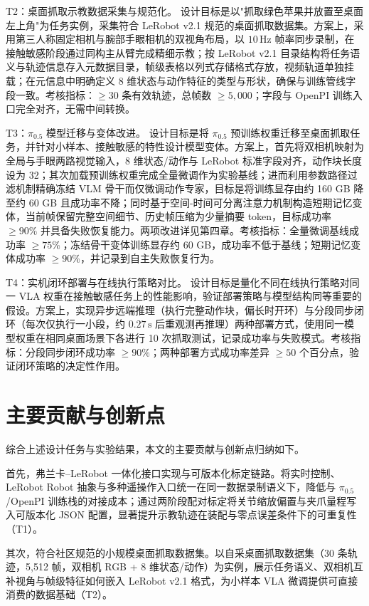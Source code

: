 T2：桌面抓取示教数据采集与规范化。
设计目标是以"抓取绿色苹果并放置至桌面左上角"为任务实例，采集符合 LeRobot v2.1 规范的桌面抓取数据集。方案上，采用第三人称固定相机与腕部手眼相机的双视角布局，以 $10\,\mathrm{Hz}$ 帧率同步录制，在接触敏感阶段通过同构主从臂完成精细示教；按 LeRobot v2.1 目录结构将任务语义与轨迹信息存入元数据目录，帧级表格以列式存储格式存放，视频轨道单独挂载；在元信息中明确定义 8 维状态与动作特征的类型与形状，确保与训练管线字段一致。考核指标：$\geqslant 30$ 条有效轨迹，总帧数 $\geqslant 5,000$；字段与 OpenPI 训练入口完全对齐，无需中间转换。

T3：$\pi_{0.5}$ 模型迁移与变体改进。
设计目标是将 $\pi_{0.5}$ 预训练权重迁移至桌面抓取任务，并针对小样本、接触敏感的特性设计模型变体。方案上，首先将双相机映射为全局与手眼两路视觉输入，8 维状态/动作与 LeRobot 标准字段对齐，动作块长度设为 32；其次加载预训练权重完成全量微调作为实验基线；进而利用参数路径过滤机制精确冻结 VLM 骨干而仅微调动作专家，目标是将训练显存由约 160 GB 降至约 60 GB 且成功率不降；同时基于空间-时间可分离注意力机制构造短期记忆变体，当前帧保留完整空间细节、历史帧压缩为少量摘要 token，目标成功率 $\geqslant 90\%$ 并具备失败恢复能力。两项改进详见第四章。考核指标：全量微调基线成功率 $\geqslant 75\%$；冻结骨干变体训练显存约 60 GB，成功率不低于基线；短期记忆变体成功率 $\geqslant 90\%$，并记录到自主失败恢复行为。

T4：实机闭环部署与在线执行策略对比。
设计目标是量化不同在线执行策略对同一 VLA 权重在接触敏感任务上的性能影响，验证部署策略与模型结构同等重要的假设。方案上，实现异步远端推理（执行完整动作块，偏长时开环）与分段同步闭环（每次仅执行一小段，约 $0.27\,\mathrm{s}$ 后重观测再推理）两种部署方式，使用同一模型权重在相同桌面场景下各进行 10 次抓取测试，记录成功率与失败模式。考核指标：分段同步闭环成功率 $\geqslant 90\%$；两种部署方式成功率差异 $\geqslant 50$ 个百分点，验证闭环策略的决定性作用。

\section{主要贡献与创新点}

综合上述设计任务与实验结果，本文的主要贡献与创新点归纳如下。

首先，弗兰卡--LeRobot 一体化接口实现与可版本化标定链路。将实时控制、LeRobot Robot 抽象与多种遥操作入口统一在同一数据录制语义下，降低与 $\pi_{0.5}$/OpenPI 训练栈的对接成本；通过两阶段配对标定将关节缩放偏置与夹爪量程写入可版本化 JSON 配置，显著提升示教轨迹在装配与零点误差条件下的可重复性（T1）。

其次，符合社区规范的小规模桌面抓取数据集。以自采桌面抓取数据集（30 条轨迹，5,512 帧，双相机 RGB + 8 维状态/动作）为实例，展示任务语义、双相机互补视角与帧级特征如何嵌入 LeRobot v2.1 格式，为小样本 VLA 微调提供可直接消费的数据基础（T2）。

